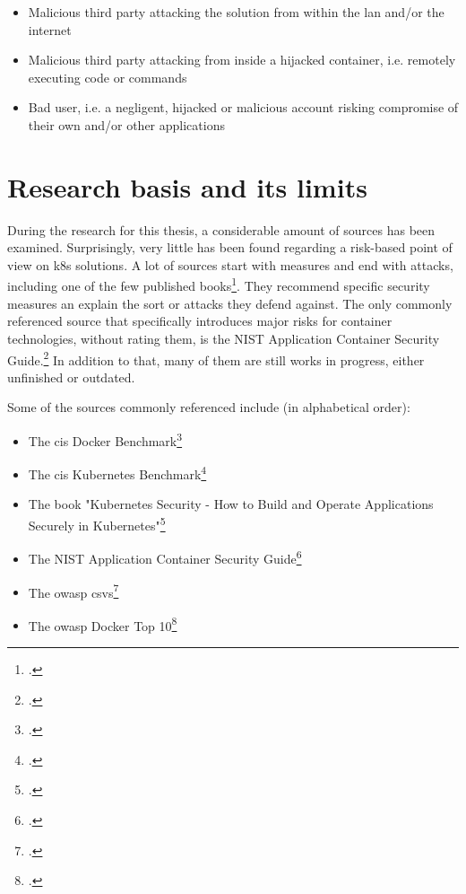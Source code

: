 \begin{itemize}

\item Malicious third party attacking the solution from within the \gls{lan} and/or the internet

\item Malicious third party attacking from inside a hijacked container, i.e. remotely executing code or commands

\item Bad user, i.e. a negligent, hijacked or malicious account risking compromise of their own and/or other applications

\end{itemize}

\section{Research basis and its limits}

During the research for this thesis, a considerable amount of sources has been examined. Surprisingly, very little has been found regarding a risk-based point of view on \gls{k8s} solutions. A lot of sources start with measures and end with attacks, including one of the few published books\footcite{k8sBook}. They recommend specific security measures an explain the sort or attacks they defend against. The only commonly referenced source that specifically introduces major risks for container technologies, without rating them, is the NIST Application Container Security Guide.\footcite{nistK8s}
In addition to that, many of them are still works in progress, either unfinished or outdated.

Some of the sources commonly referenced include (in alphabetical order):
\begin{itemize}

\item The \gls{cis} Docker Benchmark\footcite{cisDocker}

\item The \gls{cis} Kubernetes Benchmark\footcite{cisK8s}

\item The book "Kubernetes Security - How to Build and Operate Applications Securely in Kubernetes"\footcite{k8sBook}

\item The NIST Application Container Security Guide\footcite{nistK8s}

\item The \gls{owasp} \gls{csvs}\footcite{csvsGithub}

\item The \gls{owasp} Docker Top 10\footcite{dockerTop10Github}

\end{itemize}

